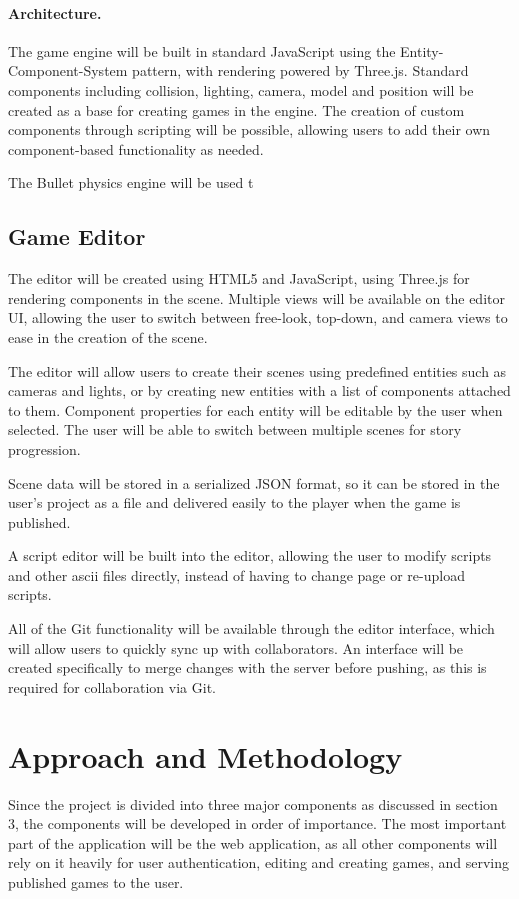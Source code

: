 \documentclass[a4paper, 12pt]{article}
\begin{document}
\paragraph{Architecture.}
The game engine will be built in standard JavaScript using the Entity-Component-System pattern, with rendering powered by Three.js. Standard components including collision, lighting, camera, model and position will be created as a base for creating games in the engine. The creation of custom components through scripting will be possible, allowing users to add their own component-based functionality as needed.

The Bullet physics engine will be used t

\subsection{Game Editor}
The editor will be created using HTML5 and JavaScript, using Three.js for rendering components in the scene. Multiple views will be available on the editor UI, allowing the user to switch between free-look, top-down, and camera views to ease in the creation of the scene.

The editor will allow users to create their scenes using predefined entities such as cameras and lights, or by creating new entities with a list of components attached to them. Component properties for each entity will be editable by the user when selected. The user will be able to switch between multiple scenes for story progression.

Scene data will be stored in a serialized JSON format, so it can be stored in the user's project as a file and delivered easily to the player when the game is published.

A script editor will be built into the editor, allowing the user to modify scripts and other ascii files directly, instead of having to change page or re-upload scripts.

All of the Git functionality will be available through the editor interface, which will allow users to quickly sync up with collaborators. An interface will be created specifically to merge changes with the server before pushing, as this is required for collaboration via Git.

\section{Approach and Methodology}
Since the project is divided into three major components as discussed in section 3, the components will be developed in order of importance. The most important part of the application will be the web application, as all other components will rely on it heavily for user authentication, editing and creating games, and serving published games to the user.
\end{document}
